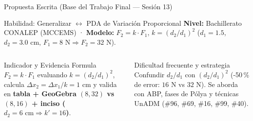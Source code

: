 \documentclass[spanish,aspectratio=1610,xcolor={dvipsnames,table}]{beamer}
\begin{document}
\begin{frame}{Propuesta Escrita (Base del Trabajo Final — Sesión 13)}
  \begin{block}{Habilidad: Generalizar $\longleftrightarrow$ PDA de Variación Proporcional}
    \textbf{Nivel:} Bachillerato CONALEP (MCCEMS) · \textbf{Modelo:} $F_2 = k\cdot F_1$, $k = (d_2/d_1)^2$ ($d_1=1.5$, $d_2=3.0\text{ cm}$, $F_1=8\text{ N} \Rightarrow F_2=32\text{ N}$).
  \end{block}
  \vspace{0.15cm}
  \begin{columns}[T]
      \begin{block}{Indicador y Evidencia}
        Formula $F_2 = k\cdot F_1$ evaluando $k=(d_2/d_1)^2$, calcula $\Delta x_2=\Delta x_1/k = 1\text{ cm}$ y valida en \textbf{tabla + GeoGebra $(8,32)$ vs $(8,16)$ + inciso ($d_2=6\text{ cm}\Rightarrow k'=16$)}.
      \end{block}
      \begin{alertblock}{Dificultad frecuente y estrategia}
        Confundir $d_2/d_1$ con $(d_2/d_1)^2$ (-50\,\% de error: $16\text{ N}$ vs $32\text{ N}$). Se aborda con ABP, fases de Pólya y técnicas UnADM (\#96, \#69, \#16, \#99, \#40).
      \end{alertblock}
  \end{columns}
\end{frame}
\end{document}
